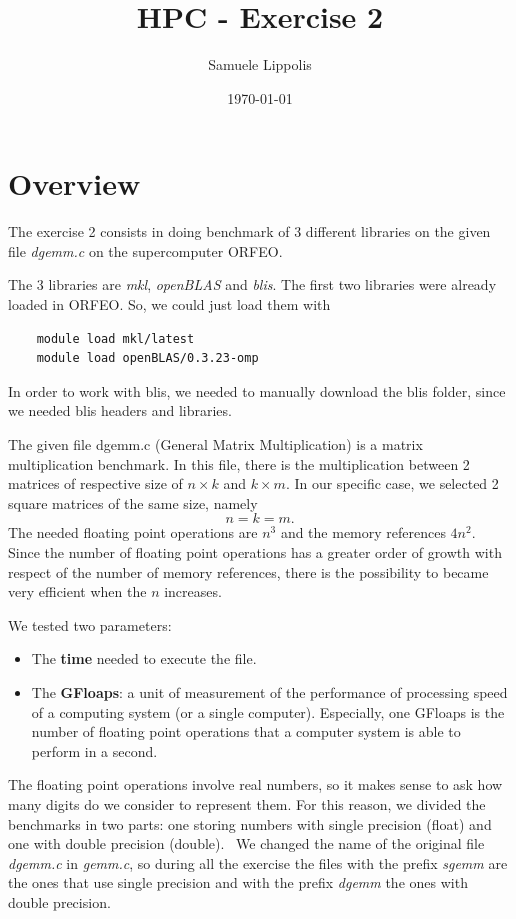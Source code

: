 \documentclass{article}
\begin{document}
\noindent
\title{HPC - Exercise 2}
\author{Samuele Lippolis}
\date{\today}

\maketitle

\tableofcontents

\section{Overview}
The exercise 2 consists in doing benchmark of 3 different libraries on the given file \textit{dgemm.c} on the supercomputer ORFEO.

The 3 libraries are \textit{mkl}, \textit{openBLAS} and \textit{blis}. The first two libraries were already loaded in ORFEO. So, we could just load them with
\begin{verbatim}
    module load mkl/latest
    module load openBLAS/0.3.23-omp
\end{verbatim}
In order to work with blis, we needed to manually download the blis folder, since we needed blis headers and libraries. 

The given file dgemm.c (General Matrix Multiplication) is a matrix multiplication benchmark. In this file, there is the multiplication between 2 matrices of respective size of $n \times k $ and $ k \times m$. In our specific case, we selected 2 square matrices of the same size, namely 
\begin{equation*}
  n = k = m .   
\end{equation*}
The needed floating point operations are $n^3$ and the memory references $4n^2$. Since the number of floating point operations has a greater order of growth with respect of the number of memory references, there is the possibility to became very efficient when the $n$ increases.

We tested two parameters: 
\begin{itemize}
    \item The \textbf{time} needed to execute the file.
    \item The \textbf{GFloaps}: a unit of measurement of the performance of processing speed of a computing system (or a single computer). Especially, one GFloaps is the number of floating point operations that a computer system is able to perform in a second. 
\end{itemize}
The floating point operations involve real numbers, so it makes sense to ask how many digits do we consider to represent them. For this reason, we divided the benchmarks in two parts: one storing numbers with single precision (float) and one with double precision (double). \
We changed the name of the original file \textit{dgemm.c} in \textit{gemm.c}, so during all the exercise the files with the prefix \textit{sgemm} are the ones that use single precision and with the prefix \textit{dgemm} the ones with double precision. 
\end{document}
